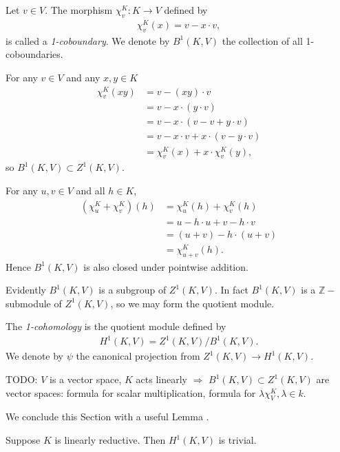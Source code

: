 \begin{definition} Let $v \in V$. The morphism $\chi^K_v:K\rightarrow V$ defined by
\begin{align*}
	\chi^K_v (x) = v - x\cdot v,
\end{align*}
is called a \emph{1-coboundary}. We denote by $B^1\left(K, V\right)$ the collection of all 1-coboundaries. 
\end{definition}

For any $v \in V$ and any $x, y \in K$
\begin{align*}
	\chi^K_v(xy) &=  v - (xy)\cdot v \\
	&=  v - x \cdot \left(y\cdot v \right)\\
	&=  v - x \cdot \left(v -v + y\cdot v \right)\\
	&=  v - x\cdot v + x\cdot \left( v - y\cdot v\right)\\
	&=  \chi^K_v(x) + x\cdot \chi^K_v(y),
\end{align*}
so $B^1(K, V) \subset Z^1(K, V)$. 

For any $u,v \in V$ and all $h \in K$,
\begin{align*}
	(\chi^K_u + \chi^K_v)(h) &=  \chi^K_u(h) + \chi^K_v(h)\\
	&=  u - h\cdot u + v - h\cdot v \\
	&=  (u + v) - h\cdot (u + v) \\
	&=  \chi^K_{u + v} (h).
\end{align*}
Hence $B^1\left(K, V\right)$ is also closed under pointwise addition.

Evidently $B^1(K, V)$ is a subgroup of $Z^1(K, V)$. In fact $B^1(K, V)$ is a $\mathbb{Z}-$submodule of $Z^1(K, V)$, so we may form the quotient module.
\begin{definition} The \emph{1-cohomology} is the quotient module defined by
\begin{align*}
	H^1\left(K, V\right) = Z^1\left(K, V\right) / B^1\left(K, V\right).
\end{align*}
We denote by $\psi$ the canonical projection from $Z^1(K, V)\rightarrow H^1(K, V)$.
\end{definition}

TODO: $V$ is a vector space, $K$ acts linearly $\Rightarrow$ $B^1(K, V) \subset Z^1(K, V)$ are vector spaces: formula for scalar multiplication, formula for $\lambda\chi^K_V, \lambda \in k$.

We conclude this Section with a useful Lemma \cite[Proposition 1]{kemper2000characterization}.
\begin{lemma} Suppose $K$ is linearly reductive. Then $H^1(K, V)$ is trivial.
  \label{lem:lin_red_h}
\end{lemma}

